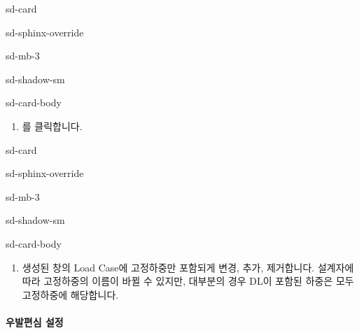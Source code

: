 \documentclass[a4paper,10pt,korean]{sphinxmanual}
\begin{document}
\begin{sphinxuseclass}{sd-card}
\begin{sphinxuseclass}{sd-sphinx-override}
\begin{sphinxuseclass}{sd-mb-3}
\begin{sphinxuseclass}{sd-shadow-sm}
\begin{sphinxuseclass}{sd-card-body}\begin{enumerate}
%
\item {} 
\sphinxAtStartPar
{} \sphinxhyphen{}  를 클릭합니다.

\end{enumerate}

\end{sphinxuseclass}
\end{sphinxuseclass}
\end{sphinxuseclass}
\end{sphinxuseclass}
\end{sphinxuseclass}
\begin{sphinxuseclass}{sd-card}
\begin{sphinxuseclass}{sd-sphinx-override}
\begin{sphinxuseclass}{sd-mb-3}
\begin{sphinxuseclass}{sd-shadow-sm}
\begin{sphinxuseclass}{sd-card-body}\begin{enumerate}
%
\setcounter{enumi}{1}
\item {} 
\sphinxAtStartPar
생성된 창의 Load Case에 고정하중만 포함되게 변경, 추가, 제거합니다.
설계자에 따라 고정하중의 이름이 바뀔 수 있지만, 대부분의 경우 DL이 포함된 하중은 모두 고정하중에 해당합니다.

\end{enumerate}

\end{sphinxuseclass}
\end{sphinxuseclass}
\end{sphinxuseclass}
\end{sphinxuseclass}
\end{sphinxuseclass}

\paragraph{우발편심 설정}
\label{\detokenize{1_mass_ecc_setting:id4}}
\sphinxstepscope
\end{document}
